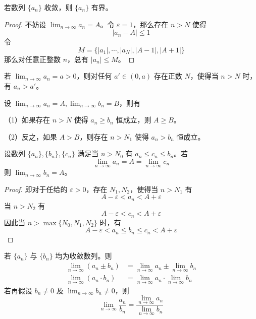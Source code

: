 \begin{theorem}[有界性]
	若数列 $\{a_n\}$ 收敛，则 $\{a_n\}$ 有界。
\end{theorem}

\begin{proof}
	不妨设 $\displaystyle\lim_{n\to \infty} a_n = A$。令 $\varepsilon = 1$，那么存在 $n>N$ 使得
	$$|a_n-A| \leqslant 1$$
	令
	$$M = \{|a_1|,\cdots,|a_N|,|A-1|,|A+1|\}$$
	那么对任意正整数 $n$，总有 $|a_n|\leqslant M$。
\end{proof}

\begin{theorem}[保号性]
	若 $\displaystyle\lim_{n\to \infty}a_n = a>0$，则对任何 $a'\in (0,a)$ 存在正数 $N$，使得当 $n>N$ 时，有 $a_n>a'$。
\end{theorem}

\begin{theorem}
	设 $\displaystyle\lim_{n\to \infty} a_n = A,\displaystyle\lim_{n\to \infty} b_n = B$，则有

	（1）如果存在 $n>N$ 使得 $a_n\geqslant b_n$ 恒成立，则 $A\geqslant B$。

	（2）反之，如果 $A>B$，则存在 $n>N_1$ 使得 $a_n>b_n$ 恒成立。
\end{theorem}

\begin{theorem}
	设数列 $\{a_n\},\{b_n\},\{c_n\}$ 满足当 $n>N_0$ 有 $a_n\leqslant c_n\leqslant b_n$。若
	$$\lim_{n\to \infty}a_n = A = \lim_{n\to \infty}c_n$$
	则 $\displaystyle\lim_{n\to \infty}b_n = A$。
\end{theorem}

\begin{proof}
	即对于任给的 $\varepsilon>0$，存在 $N_1,N_2$，使得当 $n>N_1$ 有 
	$$A-\varepsilon<a_n<A+\varepsilon$$
	当 $n>N_2$ 有 
	$$A-\varepsilon<c_n<A+\varepsilon$$
	因此当 $n>\max\{N_0,N_1,N_2\}$ 时，有
	$$A-\varepsilon < a_n \leqslant b_n \leqslant c_n < A+\varepsilon$$
\end{proof}

\begin{theorem}[四则运算法则]
	若 $\{a_n\}$ 与 $\{b_n\}$ 均为收敛数列。则
	\begin{equation*}
		\begin{aligned}
			\lim_{n\to \infty}(a_n \pm b_n) &= \lim_{n\to \infty}a_n \pm \lim_{n\to \infty}b_n\\
			\lim_{n\to \infty}(a_n \cdot b_n) &= \lim_{n\to \infty}a_n \cdot \lim_{n\to \infty}b_n
		\end{aligned}
	\end{equation*}
	若再假设 $b_n \ne 0$ 及 $\displaystyle\lim_{n\to \infty}b_n \ne 0$，则
	\begin{equation*}
		\lim_{n\to \infty}\frac{a_n}{b_n} = \frac{\lim_{n\to \infty}a_n}{\lim_{n\to \infty}b_n}
	\end{equation*}
\end{theorem}

